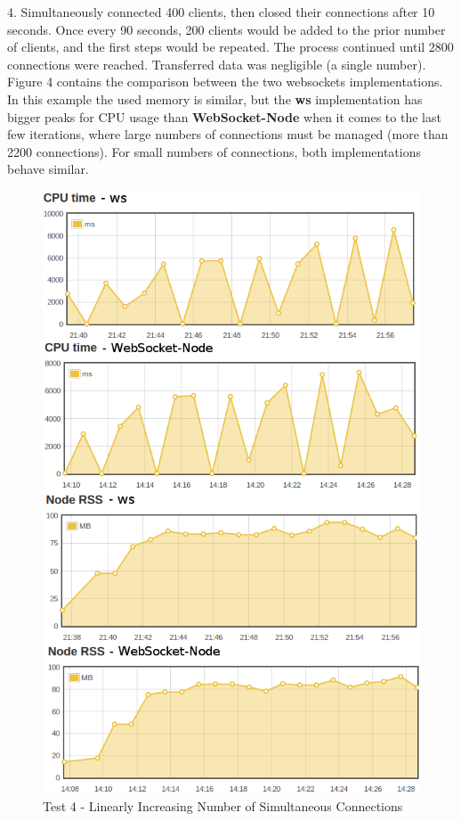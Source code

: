 \documentclass[conference]{IEEEtran}
\begin{document}
4. Simultaneously connected 400 clients, then closed their connections after 10
seconds. Once every 90 seconds, 200 clients would be added to the prior number
of clients, and the first steps would be repeated. The process continued until 2800 connections were reached. Transferred data was negligible (a single number).
Figure 4 contains the comparison between the two websockets implementations. In
this example the used memory is similar, but the \textbf{ws} implementation has
bigger peaks for CPU usage than \textbf{WebSocket-Node} when it comes to the
last few iterations, where large numbers of connections must be managed (more
than 2200 connections). For small numbers of connections, both implementations
behave similar.
\begin{frame}{}
  \begin{figure}
    \centering
	\includegraphics[width=1\linewidth]{img/test4v2.png}
    \caption{Test 4 - Linearly Increasing Number of Simultaneous Connections}
  \end{figure}
\end{frame}
\\
\end{document}
